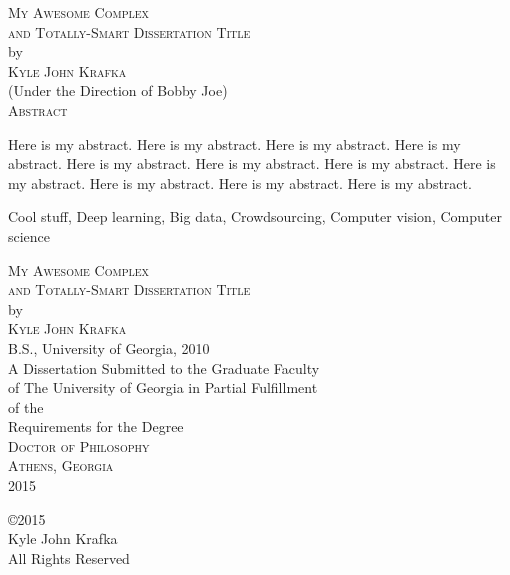 \documentclass[12pt,notitlepage]{report}  %
\newcommand{\dissertationtitle}{My Awesome Complex\\and Totally-Smart Dissertation Title}
\newcommand{\whoami}{Kyle John Krafka}
\begin{document}
\newpage
\thispagestyle{empty}
\vspace*{18pt}
\begin{center}
\textsc{\large{\dissertationtitle}}\\[18pt]  %
by\\[18pt]
\textsc{\whoami}\\[12pt]
(Under the Direction of Bobby Joe)\\[12pt]
\textsc{Abstract}
\end{center}
Here is my abstract. Here is my abstract. Here is my abstract. Here is my
abstract. Here is my abstract. Here is my abstract. Here is my abstract. Here is
my abstract. Here is my abstract. Here is my abstract. Here is my abstract.
\thispagestyle{empty}

\begin{list}{\textsc{Index words:\hfill}}{\leftmargin 1.4in}
\item 
\begin{flushleft}\singlespacing
Cool stuff,
Deep learning,
Big data,
Crowdsourcing,
Computer vision,
Computer science
\end{flushleft}
\end{list}

\newpage
{}
\thispagestyle{empty}
\vspace*{18pt}
\begin{center}
\textsc{\large{\dissertationtitle}}\\[18pt]
by\\[18pt]
\textsc{\whoami}\\[12pt]
B.S., University of Georgia, 2010\\
\vfill
A Dissertation Submitted to the Graduate Faculty \\
of The University of Georgia in Partial Fulfillment \\
of the \\
Requirements for the Degree \\[10pt]
\textsc{Doctor of Philosophy}\\[36pt]
\textsc{Athens, Georgia}\\[18pt]
2015
\end{center}

\newpage
\thispagestyle{empty}
\vspace*{5.5in}
\begin{center}
\copyright 2015 \\
\whoami \\
All Rights Reserved
\end{center}
\end{document}
